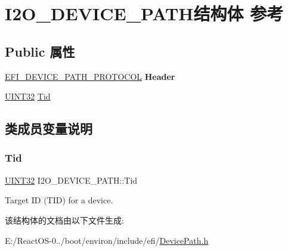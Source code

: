 \hypertarget{struct_i2_o___d_e_v_i_c_e___p_a_t_h}{}\section{I2\+O\+\_\+\+D\+E\+V\+I\+C\+E\+\_\+\+P\+A\+T\+H结构体 参考}
\label{struct_i2_o___d_e_v_i_c_e___p_a_t_h}
\subsection*{Public 属性}
\begin{DoxyCompactItemize}
\item 
\mbox{\label{struct_i2_o___d_e_v_i_c_e___p_a_t_h_a3d1feeb29b4f9e624708e0f0e2d8d83f}} 
\hyperlink{struct_e_f_i___d_e_v_i_c_e___p_a_t_h___p_r_o_t_o_c_o_l}{E\+F\+I\+\_\+\+D\+E\+V\+I\+C\+E\+\_\+\+P\+A\+T\+H\+\_\+\+P\+R\+O\+T\+O\+C\+OL} {\bfseries Header}
\item 
\hyperlink{_processor_bind_8h_ae1e6edbbc26d6fbc71a90190d0266018}{U\+I\+N\+T32} \hyperlink{struct_i2_o___d_e_v_i_c_e___p_a_t_h_a3eef9aa2e58f1d2aa4286a98bb0db893}{Tid}
\end{DoxyCompactItemize}


\subsection{类成员变量说明}
\mbox{\label{struct_i2_o___d_e_v_i_c_e___p_a_t_h_a3eef9aa2e58f1d2aa4286a98bb0db893}} 
\subsubsection{\texorpdfstring{Tid}{Tid}}
{\footnotesize\ttfamily \hyperlink{_processor_bind_8h_ae1e6edbbc26d6fbc71a90190d0266018}{U\+I\+N\+T32} I2\+O\+\_\+\+D\+E\+V\+I\+C\+E\+\_\+\+P\+A\+T\+H\+::\+Tid}

Target ID (T\+ID) for a device. 

该结构体的文档由以下文件生成\+:\begin{DoxyCompactItemize}
\item 
E\+:/\+React\+O\+S-\/0../boot/environ/include/efi/\hyperlink{_device_path_8h}{Device\+Path.\+h}\end{DoxyCompactItemize}
